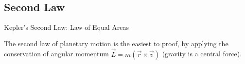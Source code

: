 \documentclass[12pt,compress,aspectratio=169]{beamer}
\begin{document}
\subsection{Second Law}

\begin{frame}{Kepler's Second Law: Law of Equal Areas}
  \begin{center}

  \end{center}
  The second law of planetary motion is the easiest to proof, by applying the
  conservation of angular momentum $\vec L=m(\vec r\times\vec v)$ (gravity is a
  central force).
\end{frame}


%    
%
%      
\end{document}
